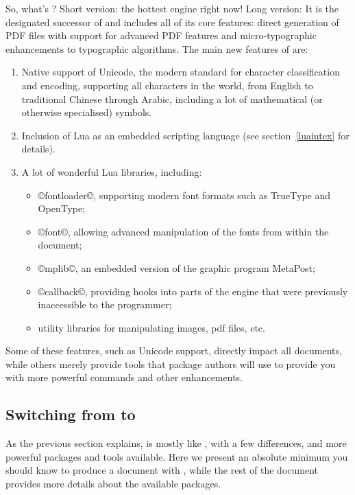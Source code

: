 \documentclass{lltxdoc}
\begin{document}
So, what's \luatex? Short version: the hottest \tex engine right now!
Long version: It is the designated successor of \pdftex and
includes all of its core features: direct generation of PDF files with support
for advanced PDF features and micro-typographic enhancements to \tex
typographic algorithms. The main new features of \luatex are:
\begin{enumerate}
  \item Native support of Unicode, the modern standard for character
    classification and encoding, supporting all characters in the world, from
    English to traditional Chinese through Arabic, including a lot of
    mathematical (or otherwise specialised) symbols.
  \item Inclusion of Lua as an embedded scripting language (see
    section~\ref{luaintex} for details).
  \item A lot of wonderful Lua libraries, including:
    \begin{itemize}
      \item ©fontloader©, supporting modern font formats such as
        TrueType and OpenType;
      \item ©font©, allowing advanced manipulation of the fonts
        from within the document;
      \item ©mplib©, an embedded version of the graphic program MetaPost;
      \item ©callback©, providing hooks into parts of the \tex engine that
        were previously inaccessible to the programmer;
      \item utility libraries for manipulating images, pdf files, etc.
    \end{itemize}
\end{enumerate}
Some of these features, such as Unicode support, directly impact all
documents, while others merely provide tools that package authors will use to
provide you with more powerful commands and other enhancements.

\subsection{Switching from \latex to \lualatex}\label{switch}

As the previous section explains, \lualatex is mostly like \latex, with a few
differences, and more powerful packages and tools available. Here we present
an absolute minimum you should know to produce a document with \lualatex, while
the rest of the document provides more details about the available packages.
\end{document}
